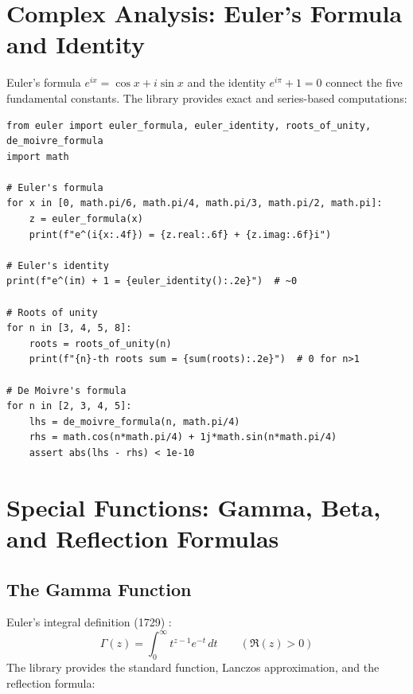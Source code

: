 \documentclass[11pt,a4paper]{article}
\theoremstyle{definition}
\begin{document}
\section{Complex Analysis: Euler's Formula and Identity}
\label{sec:complex}

Euler's formula $e^{ix} = \cos x + i\sin x$ \cite{euler1748} and the identity $e^{i\pi}+1=0$ connect the five fundamental constants. The library provides exact and series-based computations:

\begin{lstlisting}[caption={Euler's formula and roots of unity}, label=lst:complex]
from euler import euler_formula, euler_identity, roots_of_unity, de_moivre_formula
import math

# Euler's formula
for x in [0, math.pi/6, math.pi/4, math.pi/3, math.pi/2, math.pi]:
    z = euler_formula(x)
    print(f"e^(i{x:.4f}) = {z.real:.6f} + {z.imag:.6f}i")

# Euler's identity
print(f"e^(iπ) + 1 = {euler_identity():.2e}")  # ~0

# Roots of unity
for n in [3, 4, 5, 8]:
    roots = roots_of_unity(n)
    print(f"{n}-th roots sum = {sum(roots):.2e}")  # 0 for n>1

# De Moivre's formula
for n in [2, 3, 4, 5]:
    lhs = de_moivre_formula(n, math.pi/4)
    rhs = math.cos(n*math.pi/4) + 1j*math.sin(n*math.pi/4)
    assert abs(lhs - rhs) < 1e-10
\end{lstlisting}

\section{Special Functions: Gamma, Beta, and Reflection Formulas}
\label{sec:special_functions}

\subsection{The Gamma Function}
Euler's integral definition (1729) \cite{euler1729}:
\[
\Gamma(z) = \int_0^\infty t^{z-1} e^{-t}\, dt \qquad (\Re(z) > 0)
\]
The library provides the standard function, Lanczos approximation, and the reflection formula:
\end{document}
